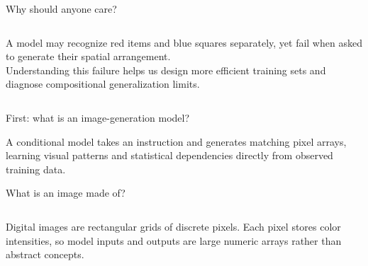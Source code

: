 \documentclass[aspectratio=169,11pt]{beamer}
\begin{document}
\begin{frame}{Why should anyone care?}
\begin{columns}[T]
\large A model may recognize red items and blue squares separately, yet fail when asked to generate their spatial arrangement.
\vspace{3mm}\\
\normalsize Understanding this failure helps us design more efficient training sets and diagnose compositional generalization limits.
\end{columns}
\end{frame}

\begin{frame}{First: what is an image-generation model?}
\begin{center}\end{center}
\vspace{2mm}
\normalsize A conditional model takes an instruction and generates matching pixel arrays, learning visual patterns and statistical dependencies directly from observed training data.
\end{frame}

\begin{frame}{What is an image made of?}
\begin{columns}
\normalsize Digital images are rectangular grids of discrete pixels. Each pixel stores color intensities, so model inputs and outputs are large numeric arrays rather than abstract concepts.
\centering
{}
\end{columns}
\end{frame}
\end{document}
